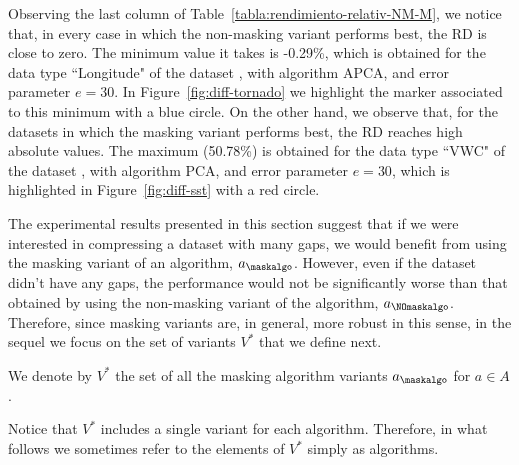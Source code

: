 Observing the last column of Table~\ref{tabla:rendimiento-relativ-NM-M}, we notice that, in every case in which the non-masking variant performs best, the RD is close to zero. The minimum value it takes is -0.29\%, which is obtained for the data type ``Longitude" of the dataset \datasettornado, with algorithm APCA, and error parameter $e=30$. In Figure~\ref{fig:diff-tornado} we highlight the marker associated to this minimum with a blue circle. On the other hand, we observe that, for the datasets in which the masking variant performs best, the RD reaches high absolute values. The maximum (50.78\%) is obtained for the data type ``VWC" of the dataset \datasetsst, with algorithm PCA, and error parameter $e=30$, which is highlighted in Figure~\ref{fig:diff-sst} with a red circle.


\newcommand{\vaster}{V^*}
The experimental results presented in this section suggest that if we were interested in compressing a dataset with many gaps, we would benefit from using the masking variant of an algorithm, $a_\maskalgo$. However, even if the dataset didn't have any gaps, the performance would not be significantly worse than that obtained by using the non-masking variant of the algorithm, $a_\NOmaskalgo$. Therefore, since masking variants are, in general, more robust in this sense, in the sequel we focus on the set of variants $\vaster$ that we define next.


\vspace{+5pt}
\begin{defcion}
\label{defcion:vaster}
We denote by $\vaster$ the set of all the masking algorithm variants $a_\maskalgo$ for $a \in A$.
\end{defcion}


Notice that $\vaster$ includes a single variant for each algorithm. Therefore, in what follows we sometimes refer to the elements of $\vaster$ simply as algorithms.

